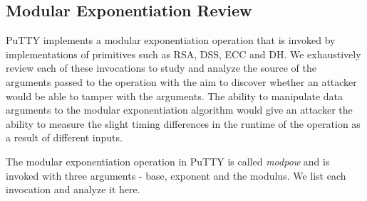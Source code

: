 \documentclass{bhamthesis}
\begin{document}
\subsection{Modular Exponentiation Review}
PuTTY implements a modular exponentiation operation that is invoked by implementations of primitives such as RSA, DSS, ECC and DH. We exhaustively review each of these invocations to study and analyze the source of the arguments passed to the operation with the aim to discover whether an attacker would be able to tamper with the arguments. The ability to manipulate data arguments to the modular exponentiation algorithm would give an attacker the ability to measure the slight timing differences in the runtime of the operation as a result of different inputs.\par
The modular exponentiation operation in PuTTY is called \textit{modpow} and is invoked with three arguments - base, exponent and the modulus. We list each invocation and analyze it here.\par
\clearpage
\end{document}
